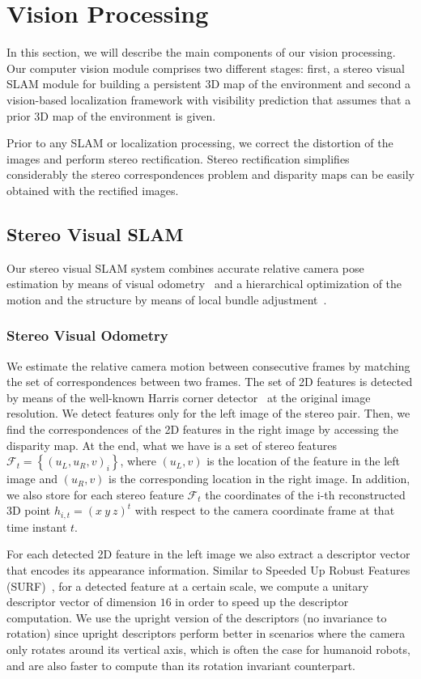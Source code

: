 
\section{Vision Processing}\label{sec:vision}
In this section, we will describe the main components of our vision processing. Our computer vision module comprises two different stages: first, a stereo visual SLAM module for building a persistent 3D map of the environment and second a vision-based localization framework with visibility prediction that assumes that a prior 3D map of the environment is given. 

Prior to any SLAM or localization processing, we correct the distortion of the images and perform stereo rectification. Stereo rectification simplifies considerably the stereo correspondences problem and disparity maps can be easily obtained with the rectified images.
\subsection{Stereo Visual SLAM}\label{sec:vslam}
Our stereo visual SLAM system combines accurate relative camera pose estimation by means of visual odometry~\cite{Kaess09icra} and a hierarchical optimization of the motion and the structure by means of
local bundle adjustment~\cite{Mouragnon09ivc}.

\subsubsection{Stereo Visual Odometry}\label{sec:visual_odometry}
We estimate the relative camera motion between consecutive frames by matching the set of correspondences between two frames. The set of 2D features is detected by means of the well-known Harris corner detector~\cite{Harris88avc} at the original image resolution. We detect features only for the left image of the stereo pair. Then, we find the correspondences of the 2D features in the right image by
accessing the disparity map. At the end, what we have is a set of stereo features
$\mathcal{F}_{t}=\left\{\left(u_{L},u_{R},v\right)_{i}\right\}$, where $\left(u_{L},v\right)$ is the location of the feature in the left image and $\left(u_{R},v\right)$ is the corresponding location in the
right image. In addition, we also store for each stereo feature $\mathcal{F}_{t}$ the coordinates of the i-th reconstructed 3D point $h_{i,t}=\left(x \ y \ z\right)^{t}$ with respect to the camera
coordinate frame at that time instant $t$.

For each detected 2D feature in the left image we also extract a descriptor vector that encodes its appearance information. Similar to Speeded Up Robust Features (SURF)~\cite{Bay08cviu}, for a detected
feature at a certain scale, we compute a unitary descriptor vector of dimension $16$ in order to speed up the descriptor computation. We use the upright version of the descriptors (no invariance to rotation)
since upright descriptors perform better in scenarios where the camera only rotates around its vertical axis, which is often the case for humanoid robots, and are also faster to compute than its rotation invariant counterpart.

